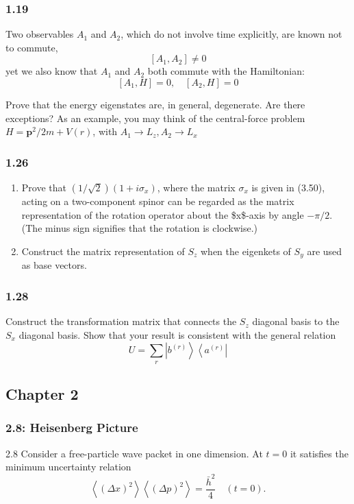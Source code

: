 \documentclass[11pt]{article}
\begin{document}
\subsubsection{1.19}
\label{sec:orgeff3db8}
Two observables \(A_1\) and \(A_2\), which do not involve time explicitly, are known not to commute,
$$
\left[A_1, A_2\right] \neq 0
$$
yet we also know that \(A_1\) and \(A_2\) both commute with the Hamiltonian:
$$
\left[A_1, H\right]=0, \quad\left[A_2, H\right]=0
$$

Prove that the energy eigenstates are, in general, degenerate. Are there exceptions? As an example, you may think of the central-force problem \(H=\mathbf{p}^2 / 2 m+V(r)\), with \(A_1 \rightarrow L_z, A_2 \rightarrow L_x\)
\subsubsection{1.26}
\label{sec:org9581c1c}
\begin{enumerate}
\item Prove that \((1 / \sqrt{2})\left(1+i \sigma_x\right)\), where the matrix \(\sigma_x\) is given in (3.50), acting on a two-component spinor can be regarded as the matrix representation of the rotation operator about the \$x\$-axis by angle \(-\pi / 2\). (The minus sign signifies that the rotation is clockwise.)

\item Construct the matrix representation of \(S_z\) when the eigenkets of \(S_y\) are used as base vectors.
\end{enumerate}
\subsubsection{1.28}
\label{sec:org7757026}
Construct the transformation matrix that connects the \(S_z\) diagonal basis to the \(S_x\) diagonal basis. Show that your result is consistent with the general relation
$$
U=\sum_r\left|b^{(r)}\right\rangle\left\langle a^{(r)}\right|
$$
\subsection{Chapter 2}
\label{sec:org41cfae7}

\subsubsection{2.8: Heisenberg Picture}
\label{sec:org69ae2b3}
2.8 Consider a free-particle wave packet in one dimension. At \(t=0\) it satisfies the minimum uncertainty relation
$$
\left\langle(\Delta x)^2\right\rangle\left\langle(\Delta p)^2\right\rangle=\frac{\bar{h}^2}{4} \quad(t=0) .
$$
\end{document}
